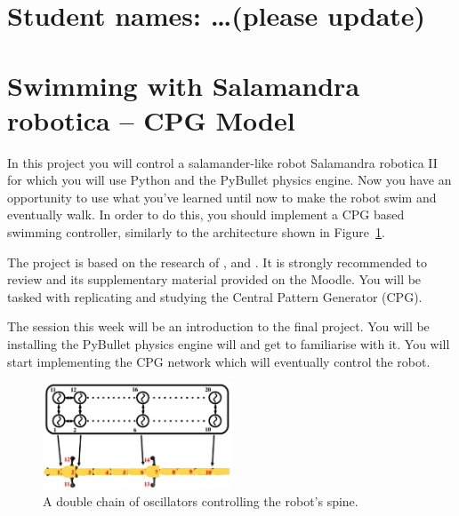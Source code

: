 \documentclass{cmc}
\begin{document}
\pagestyle{fancy}
 

\section*{Student names: \ldots (please update)}


\section*{Swimming with Salamandra robotica – CPG Model}
\label{sec:exploring-swimming}

In this project you will control a salamander-like robot Salamandra
robotica II for which you will use Python and the PyBullet physics
engine. Now you have an opportunity to use what you’ve learned until
now to make the robot swim and eventually walk. In order to do this,
you should implement a CPG based swimming controller, similarly to the
architecture shown in Figure~\ref{fig:controller-model}.

The project is based on the research of \cite{Crespi2013},
\cite{Karakasiliotis2013} and \cite{ijspeert2007swimming}. It is strongly
recommended to review \cite{ijspeert2007swimming} and its supplementary material
provided on the Moodle. You will be tasked with replicating and
studying the Central Pattern Generator (CPG).

 The session this week will be an introduction to the
final project. You will be installing the PyBullet physics engine will and get
to familiarise with it. You will start implementing the CPG network which will
eventually control the robot.

\begin{figure}[h]
  \centering
  \includegraphics[width=0.5\textwidth]{figures/model_controller.png}
  \caption[Controller model]{A double chain of oscillators controlling
    the robot’s spine.}
  \label{fig:controller-model}
\end{figure}
\end{document}
